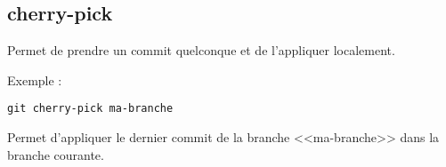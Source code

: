 \subsection*{cherry-pick}
Permet de prendre un commit quelconque et de l'appliquer localement.

Exemple : 
\begin{verbatim}
git cherry-pick ma-branche
\end{verbatim}
Permet d'appliquer le dernier commit de la branche <<ma-branche>> dans la branche courante.

